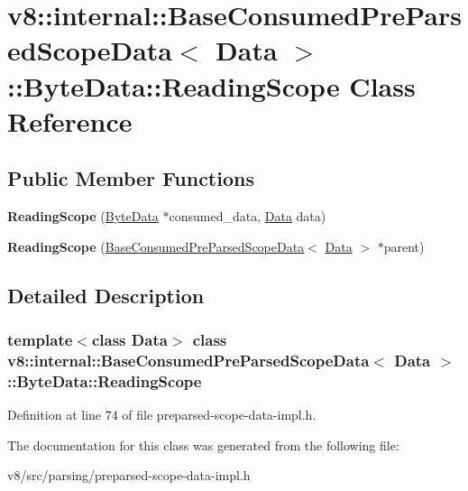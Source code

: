 \hypertarget{classv8_1_1internal_1_1BaseConsumedPreParsedScopeData_1_1ByteData_1_1ReadingScope}{}\section{v8\+:\+:internal\+:\+:Base\+Consumed\+Pre\+Parsed\+Scope\+Data$<$ Data $>$\+:\+:Byte\+Data\+:\+:Reading\+Scope Class Reference}
\label{classv8_1_1internal_1_1BaseConsumedPreParsedScopeData_1_1ByteData_1_1ReadingScope}
\subsection*{Public Member Functions}
\begin{DoxyCompactItemize}
\item 
\mbox{\label{classv8_1_1internal_1_1BaseConsumedPreParsedScopeData_1_1ByteData_1_1ReadingScope_a5d57a689b87cf82b96e3474e5f0436bb}} 
{\bfseries Reading\+Scope} (\mbox{\hyperlink{classv8_1_1internal_1_1BaseConsumedPreParsedScopeData_1_1ByteData}{Byte\+Data}} $\ast$consumed\+\_\+data, \mbox{\hyperlink{classv8_1_1Data}{Data}} data)
\item 
\mbox{\label{classv8_1_1internal_1_1BaseConsumedPreParsedScopeData_1_1ByteData_1_1ReadingScope_a824bf6340f50af1947e9880765610f25}} 
{\bfseries Reading\+Scope} (\mbox{\hyperlink{classv8_1_1internal_1_1BaseConsumedPreParsedScopeData}{Base\+Consumed\+Pre\+Parsed\+Scope\+Data}}$<$ \mbox{\hyperlink{classv8_1_1Data}{Data}} $>$ $\ast$parent)
\end{DoxyCompactItemize}


\subsection{Detailed Description}
\subsubsection*{template$<$class Data$>$\newline
class v8\+::internal\+::\+Base\+Consumed\+Pre\+Parsed\+Scope\+Data$<$ Data $>$\+::\+Byte\+Data\+::\+Reading\+Scope}



Definition at line 74 of file preparsed-\/scope-\/data-\/impl.\+h.



The documentation for this class was generated from the following file\+:\begin{DoxyCompactItemize}
\item 
v8/src/parsing/preparsed-\/scope-\/data-\/impl.\+h\end{DoxyCompactItemize}
